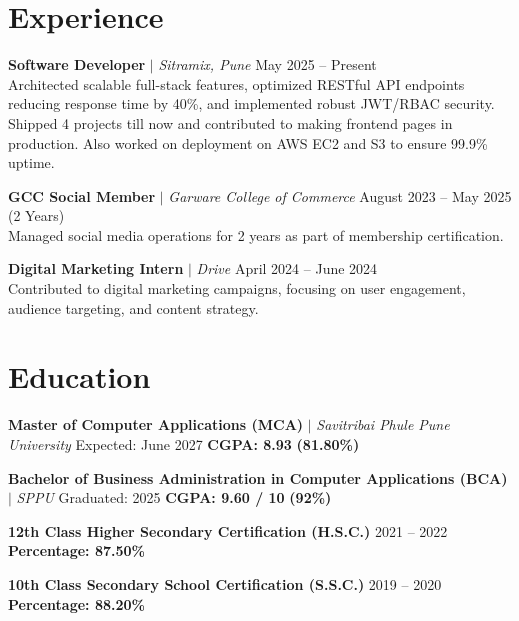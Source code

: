 \documentclass[a4paper,10pt]{article}
\begin{document}
\section*{Experience}
\textbf{Software Developer} $|$ \textit{Sitramix, Pune} \hfill May 2025 -- Present\\
Architected scalable full-stack features, optimized RESTful API endpoints reducing response time by 40\%, and implemented robust JWT/RBAC security. Shipped 4 projects till now and contributed to making frontend pages in production. Also worked on deployment on AWS EC2 and S3 to ensure 99.9\% uptime.

\vspace{6pt}

\textbf{GCC Social Member} $|$ \textit{Garware College of Commerce} \hfill August 2023 -- May 2025 (2 Years)\\
Managed social media operations for 2 years as part of membership certification.

\vspace{6pt}

\textbf{Digital Marketing Intern} $|$ \textit{Drive} \hfill April 2024 -- June 2024\\
Contributed to digital marketing campaigns, focusing on user engagement, audience targeting, and content strategy.

\section*{Education}
\textbf{Master of Computer Applications (MCA)} $|$ \textit{Savitribai Phule Pune University} \hfill Expected: June 2027 \quad \textbf{CGPA: 8.93} \textbf{(81.80\%)}

\vspace{4pt} 

\textbf{Bachelor of Business Administration in Computer Applications (BCA)} $|$ \textit{SPPU} \hfill Graduated: 2025 \quad \textbf{CGPA: 9.60 / 10} \textbf{(92\%)}

\vspace{4pt} 

\textbf{12th Class Higher Secondary Certification (H.S.C.)} \hfill 2021 -- 2022 \quad \textbf{Percentage: 87.50\%}

\vspace{4pt} 

\textbf{10th Class Secondary School Certification (S.S.C.)} \hfill 2019 -- 2020 \quad \textbf{Percentage: 88.20\%}
\end{document}
